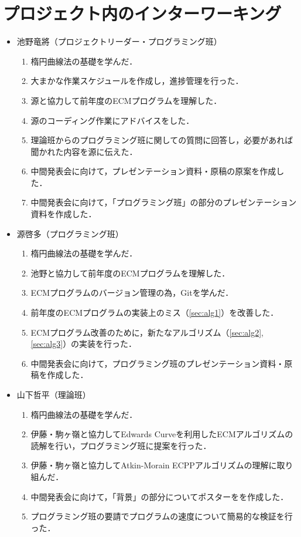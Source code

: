 \documentclass[openany,11pt,papersize]{jsbook}
\begin{document}
\chapter{プロジェクト内のインターワーキング}
\begin{itemize}
\item 池野竜將（プロジェクトリーダー・プログラミング班）
 \begin{enumerate}
 \renewcommand{\labelenumi}{(\arabic{enumi})}
 \item 楕円曲線法の基礎を学んだ．
 \item 大まかな作業スケジュールを作成し，進捗管理を行った．
 \item 源と協力して前年度のECMプログラムを理解した．
 \item 源のコーディング作業にアドバイスをした．
 \item 理論班からのプログラミング班に関しての質問に回答し，必要があれば聞かれた内容を源に伝えた．
 \item 中間発表会に向けて，プレゼンテーション資料・原稿の原案を作成した．
 \item 中間発表会に向けて，「プログラミング班」の部分のプレゼンテーション資料を作成した．
 \end{enumerate}
 
\item 源啓多（プログラミング班）
 \begin{enumerate}
 \renewcommand{\labelenumi}{(\arabic{enumi})}
 \item 楕円曲線法の基礎を学んだ．
 \item 池野と協力して前年度のECMプログラムを理解した．
 \item ECMプログラムのバージョン管理の為，Gitを学んだ．
 \item 前年度のECMプログラムの実装上のミス（\ref{sec:alg1}）を改善した．
 \item ECMプログラム改善のために，新たなアルゴリズム（\ref{sec:alg2}, \ref{sec:alg3}）の実装を行った．
 \item 中間発表会に向けて，プログラミング班のプレゼンテーション資料・原稿を作成した．
 \end{enumerate}
 
\item 山下哲平（理論班）
 \begin{enumerate}
 \renewcommand{\labelenumi}{(\arabic{enumi})}
 \item 楕円曲線法の基礎を学んだ．
 \item 伊藤・駒ヶ嶺と協力してEdwards Curveを利用したECMアルゴリズムの読解を行い，プログラミング班に提案を行った．
 \item 伊藤・駒ヶ嶺と協力してAtkin-Morain ECPPアルゴリズムの理解に取り組んだ．
 \item 中間発表会に向けて，「背景」の部分についてポスターをを作成した．
 \item プログラミング班の要請でプログラムの速度について簡易的な検証を行った．
 \end{enumerate}
 

\end{itemize}
\end{document}
